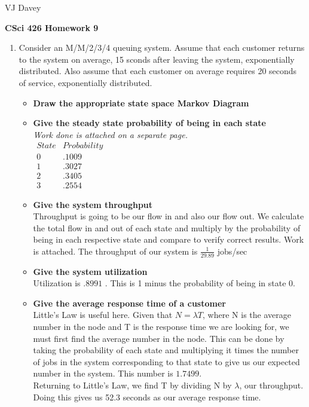 \documentclass[11pt]{article}
\begin{document}
\centerline{VJ Davey}\vskip 0.10cm
\begin{LARGE}
\centerline {\bf CSci 426 Homework 9}
\end{LARGE}
\vskip 0.25cm
\begin{enumerate}
	\item Consider an M/M/2/3/4 queuing system. Assume that each customer returns to the system on average, 15 sconds after leaving the system, exponentially distributed. Also assume that each customer on average requires 20 seconds of service, exponentially distributed. 
	\begin{itemize}
		\item\textbf{ Draw the appropriate state space Markov Diagram}
		\vskip 7cm
		\item \textbf{Give the steady state probability of being in each state}
		\\\textit{ Work done is attached on a separate page.}\\
		$\begin{array}{cc}
			State & Probability \\ 
			0 & .1009 \\ 
			1 & .3027 \\ 
			2 & .3405 \\ 
			3 & .2554
		\end{array} $
		\item \textbf{Give the system throughput}
		\\Throughput is going to be our flow in and also our flow out. We calculate the total flow in and out of each state and multiply by the probability of being in each respective state and compare to verify correct results. Work is attached.
		The throughput of our system is $\frac{1}{29.89}$ jobs/sec
		\item \textbf{Give the system utilization}
		\\Utilization is $.8991$ . This is 1 minus the probability of being in state 0.
		\item \textbf{ Give the average response time of a customer}
		\\Little's Law is useful here. Given that $N=\lambda T$, where N is the average number in the node and T is the response time we are looking for, we must first find the average number in the node. This can be done by taking the probability of each state and multiplying it times the number of jobs in the system corresponding to that state to give us our expected number in the system. This number is $1.7499$. 
		\\Returning to Little's Law, we find T by dividing N by $\lambda$, our throughput. Doing this gives us 52.3 seconds as our average response time.

\end{itemize}
\end{enumerate}
\end{document}
